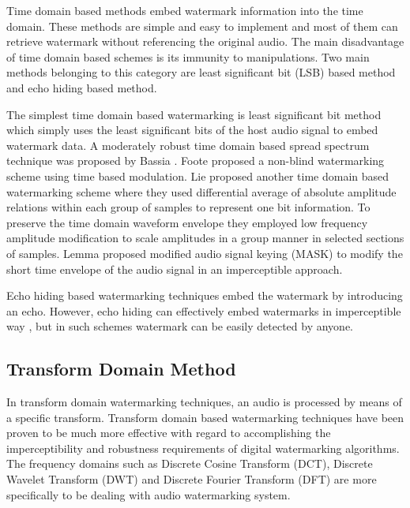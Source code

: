 \documentclass[12pt,a4paper]{report}
\begin{document}
Time domain based methods embed watermark information into the time domain. These methods are simple and easy to implement and most of them can retrieve watermark
without referencing the original audio. The main disadvantage of time domain based schemes is its immunity to manipulations. Two main methods belonging to this category are least significant bit (LSB) based method and echo hiding based method. 

\bigskip

The simplest time domain based watermarking is least significant bit \cite{zhang} method which simply uses the least significant bits of the host audio signal to embed
watermark data. A moderately robust time domain based spread spectrum technique was proposed by Bassia \cite{bassia}. Foote \cite{foote} proposed a non-blind watermarking scheme using time based modulation. Lie \cite{wnlie} proposed another time domain based watermarking scheme where they used differential average of absolute amplitude relations within each group of samples to represent one bit information. To preserve the time domain waveform envelope they employed low frequency amplitude modification to scale amplitudes in a group manner in selected sections of samples. Lemma \cite{lemma} proposed modified audio signal keying (MASK) to modify the short time envelope of the audio signal in an imperceptible approach.

\bigskip

Echo hiding based watermarking techniques embed the watermark by introducing an echo. However, echo hiding can effectively embed watermarks in imperceptible way \cite{hooh}, \cite{kbyeong} but in such schemes watermark can be easily detected by anyone.

\subsection{Transform Domain Method}

In transform domain watermarking techniques, an audio is processed by means of a specific transform. Transform domain based watermarking techniques have been proven to be much more effective with regard to accomplishing the imperceptibility and robustness requirements of digital watermarking algorithms. The frequency domains such as Discrete Cosine Transform (DCT), Discrete Wavelet Transform (DWT) and Discrete Fourier Transform (DFT) are more specifically to be dealing with audio watermarking system.

\bigskip
\end{document}
